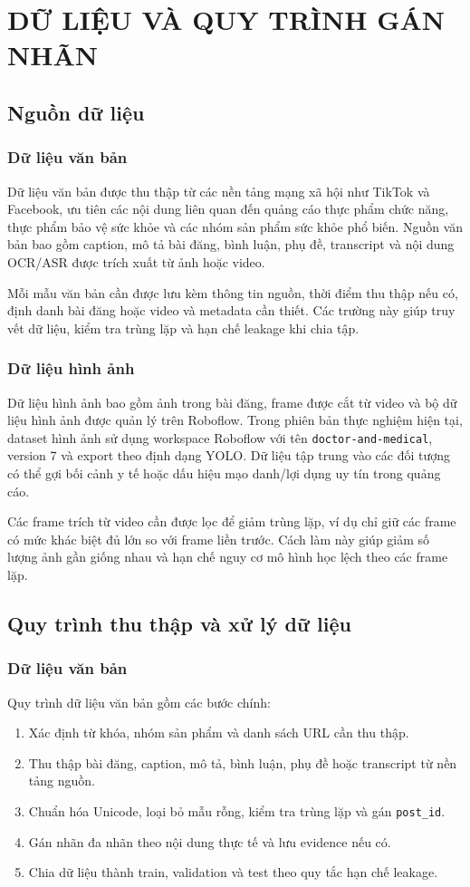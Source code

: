 \chapter{DỮ LIỆU VÀ QUY TRÌNH GÁN NHÃN}

\section{Nguồn dữ liệu}
\subsection{Dữ liệu văn bản}
Dữ liệu văn bản được thu thập từ các nền tảng mạng xã hội như TikTok và Facebook, ưu tiên các nội dung liên quan đến quảng cáo thực phẩm chức năng, thực phẩm bảo vệ sức khỏe và các nhóm sản phẩm sức khỏe phổ biến. Nguồn văn bản bao gồm caption, mô tả bài đăng, bình luận, phụ đề, transcript và nội dung OCR/ASR được trích xuất từ ảnh hoặc video.

Mỗi mẫu văn bản cần được lưu kèm thông tin nguồn, thời điểm thu thập nếu có, định danh bài đăng hoặc video và metadata cần thiết. Các trường này giúp truy vết dữ liệu, kiểm tra trùng lặp và hạn chế leakage khi chia tập.

\subsection{Dữ liệu hình ảnh}
Dữ liệu hình ảnh bao gồm ảnh trong bài đăng, frame được cắt từ video và bộ dữ liệu hình ảnh được quản lý trên Roboflow. Trong phiên bản thực nghiệm hiện tại, dataset hình ảnh sử dụng workspace Roboflow với tên \texttt{doctor-and-medical}, version 7 và export theo định dạng YOLO. Dữ liệu tập trung vào các đối tượng có thể gợi bối cảnh y tế hoặc dấu hiệu mạo danh/lợi dụng uy tín trong quảng cáo.

Các frame trích từ video cần được lọc để giảm trùng lặp, ví dụ chỉ giữ các frame có mức khác biệt đủ lớn so với frame liền trước. Cách làm này giúp giảm số lượng ảnh gần giống nhau và hạn chế nguy cơ mô hình học lệch theo các frame lặp.

\section{Quy trình thu thập và xử lý dữ liệu}
\subsection{Dữ liệu văn bản}
Quy trình dữ liệu văn bản gồm các bước chính:
\begin{enumerate}
    \item Xác định từ khóa, nhóm sản phẩm và danh sách URL cần thu thập.
    \item Thu thập bài đăng, caption, mô tả, bình luận, phụ đề hoặc transcript từ nền tảng nguồn.
    \item Chuẩn hóa Unicode, loại bỏ mẫu rỗng, kiểm tra trùng lặp và gán \texttt{post\_id}.
    \item Gán nhãn đa nhãn theo nội dung thực tế và lưu evidence nếu có.
    \item Chia dữ liệu thành train, validation và test theo quy tắc hạn chế leakage.
\end{enumerate}

